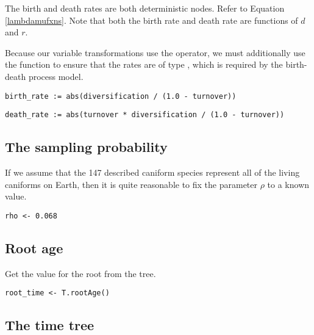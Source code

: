 The birth and death rates are both deterministic nodes. 
Refer to Equation \ref{lambdamufxns}. Note that both the birth rate and death rate are functions of $d$ and $r$.

Because our variable transformations use the \cl{-} operator, we must additionally use the  function to ensure that the rates are of type , which is required by the birth-death process model.
{\tt \begin{snugshade*}
\begin{lstlisting}
birth_rate := abs(diversification / (1.0 - turnover))
\end{lstlisting}
\end{snugshade*}}

{\tt \begin{snugshade*}
\begin{lstlisting}
death_rate := abs(turnover * diversification / (1.0 - turnover))
\end{lstlisting}
\end{snugshade*}}

\subsection{The sampling probability}

If we assume that the 147 described caniform species represent all of the living caniforms on Earth, then it is quite reasonable to fix the parameter $\rho$ to a known value.
{\tt \begin{snugshade*}
\begin{lstlisting}
rho <- 0.068
\end{lstlisting}
\end{snugshade*}}

\subsection{Root age}

Get the value for the root from the \citet{dosReis2012} tree.

{\tt \begin{snugshade*}
\begin{lstlisting}
root_time <- T.rootAge()
\end{lstlisting}
\end{snugshade*}}

\subsection{The time tree}

